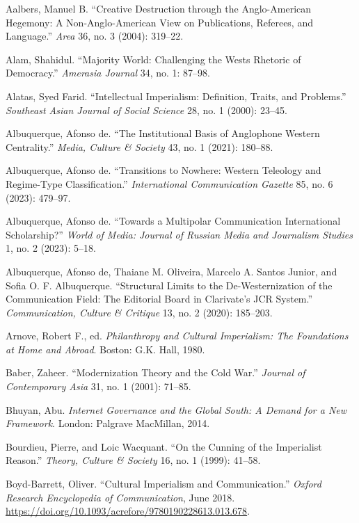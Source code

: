 \documentclass{tufte-handout}
\begin{document}
\begin{hangparas}{.25in}{1} 



Aalbers, Manuel B. ``Creative Destruction through the Anglo-American
Hegemony: A Non-Anglo-American View on Publications, Referees, and
Language.'' \emph{Area} 36, no. 3 (2004): 319--22.

Alam, Shahidul. ``Majority World: Challenging the West\textquotesingle s
Rhetoric of Democracy.'' \emph{Amerasia Journal} 34, no. 1: 87--98.

Alatas, Syed Farid. ``Intellectual Imperialism: Definition, Traits, and
Problems.'' \emph{Southeast Asian Journal of Social Science} 28, no. 1
(2000): 23--45.

Albuquerque, Afonso de. ``The Institutional Basis of Anglophone Western
Centrality.'' \emph{Media, Culture \& Society} 43, no. 1 (2021):
180--88.

Albuquerque, Afonso de. ``Transitions to Nowhere: Western Teleology and
Regime-Type Classification.'' \emph{International Communication Gazette}
85, no. 6 (2023): 479--97.

Albuquerque, Afonso de. ``Towards a Multipolar Communication
International Scholarship?'' \emph{World of Media: Journal of Russian
Media and Journalism Studies} 1, no. 2 (2023): 5--18.

Albuquerque, Afonso de, Thaiane M. Oliveira, Marcelo A. Santos Junior,
and Sofia O. F. Albuquerque. ``Structural Limits to the
De-Westernization of the Communication Field: The Editorial Board in
Clarivate's JCR System.'' \emph{Communication, Culture \& Critique} 13,
no. 2 (2020): 185--203.

Arnove, Robert F., ed. \emph{Philanthropy and Cultural Imperialism: The
Foundations at Home and Abroad}. Boston: G.K. Hall, 1980.

Baber, Zaheer. ``Modernization Theory and the Cold War.'' \emph{Journal
of Contemporary Asia} 31, no. 1 (2001): 71--85.

Bhuyan, Abu. \emph{Internet Governance and the Global South: A Demand
for a New Framework}. London: Palgrave MacMillan, 2014.

Bourdieu, Pierre, and Loic Wacquant. ``On the Cunning of the Imperialist
Reason.'' \emph{Theory, Culture \& Society} 16, no. 1 (1999): 41--58.

Boyd-Barrett, Oliver. ``Cultural Imperialism and Communication.''
\emph{Oxford Research Encyclopedia of Communication}, June 2018.
\url{https://doi.org/10.1093/acrefore/9780190228613.013.678}.


\end{hangparas}
\end{document}
